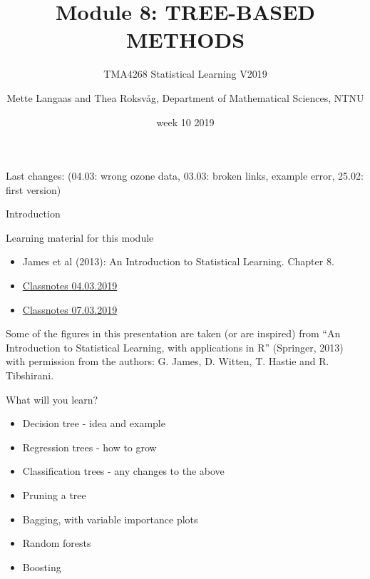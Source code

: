 \documentclass[ignorenonframetext,]{beamer}
\title{Module 8: TREE-BASED METHODS}
\subtitle{TMA4268 Statistical Learning V2019}
\author{Mette Langaas and Thea Roksvåg, Department of Mathematical Sciences,
NTNU}
\date{week 10 2019}
\providecommand{\tightlist}{%
  \setlength{\itemsep}{0pt}\setlength{\parskip}{0pt}}
\begin{document}
\frame{\titlepage}

\begin{frame}

Last changes: (04.03: wrong ozone data, 03.03: broken links, example
error, 25.02: first version)

\end{frame}

\begin{frame}{Introduction}

\begin{block}{Learning material for this module}

\begin{itemize}
\tightlist
\item
  James et al (2013): An Introduction to Statistical Learning. Chapter
  8.\\
\item
  \href{https://www.math.ntnu.no/emner/TMA4268/2019v/notes/M8L1notes.pdf}{Classnotes
  04.03.2019}
\item
  \href{https://www.math.ntnu.no/emner/TMA4268/2019v/notes/M8L2notes.pdf}{Classnotes
  07.03.2019}
\end{itemize}

Some of the figures in this presentation are taken (or are inspired)
from ``An Introduction to Statistical Learning, with applications in R''
(Springer, 2013) with permission from the authors: G. James, D. Witten,
T. Hastie and R. Tibshirani.

\end{block}

\end{frame}

\begin{frame}

\begin{block}{What will you learn?}

\begin{itemize}
\tightlist
\item
  Decision tree - idea and example
\item
  Regression trees - how to grow
\item
  Classification trees - any changes to the above
\item
  Pruning a tree
\item
  Bagging, with variable importance plots
\item
  Random forests
\item
  Boosting
\end{itemize}

\end{block}

\end{frame}
\end{document}

